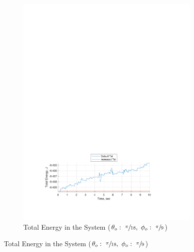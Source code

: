 \documentclass[12pt]{report}
\begin{document}
\begin{flushleft}
\begin{figure}[!ht]
\begin{subfigure}[t]{\textwidth}
  \includegraphics[center]{Energy2}
  \caption{Total Energy in the System ($\theta_o:~\sfrac{\pi}{18},~\phi_o:~\sfrac{\pi}{9}$)}
  \label{fig:Energy2}
\end{subfigure}
\end{figure}


\end{flushleft}
\end{document}

